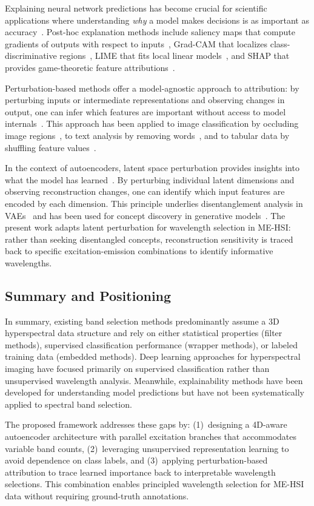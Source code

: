 Explaining neural network predictions has become crucial for scientific applications where understanding \emph{why} a model makes decisions is as important as accuracy~\cite{gilpin2018explaining}.
Post-hoc explanation methods include saliency maps that compute gradients of outputs with respect to inputs~\cite{simonyan2014deep}, Grad-CAM that localizes class-discriminative regions~\cite{selvaraju2017grad}, LIME that fits local linear models~\cite{ribeiro2016should}, and SHAP that provides game-theoretic feature attributions~\cite{lundberg2017unified}.

Perturbation-based methods offer a model-agnostic approach to attribution: by perturbing inputs or intermediate representations and observing changes in output, one can infer which features are important without access to model internals~\cite{zeiler2014visualizing}.
This approach has been applied to image classification by occluding image regions~\cite{zeiler2014visualizing}, to text analysis by removing words~\cite{li2016understanding}, and to tabular data by shuffling feature values~\cite{fisher2019all}.

In the context of autoencoders, latent space perturbation provides insights into what the model has learned~\cite{higgins2017beta}.
By perturbing individual latent dimensions and observing reconstruction changes, one can identify which input features are encoded by each dimension.
This principle underlies disentanglement analysis in VAEs~\cite{chen2018isolating} and has been used for concept discovery in generative models~\cite{voynov2020unsupervised}.
The present work adapts latent perturbation for wavelength selection in ME-HSI: rather than seeking disentangled concepts, reconstruction sensitivity is traced back to specific excitation-emission combinations to identify informative wavelengths.

\subsection{Summary and Positioning}
\label{sec:related_summary}

In summary, existing band selection methods predominantly assume a 3D hyperspectral data structure and rely on either statistical properties (filter methods), supervised classification performance (wrapper methods), or labeled training data (embedded methods).
Deep learning approaches for hyperspectral imaging have focused primarily on supervised classification rather than unsupervised wavelength analysis.
Meanwhile, explainability methods have been developed for understanding model predictions but have not been systematically applied to spectral band selection.

The proposed framework addresses these gaps by: (1)~designing a 4D-aware autoencoder architecture with parallel excitation branches that accommodates variable band counts, (2)~leveraging unsupervised representation learning to avoid dependence on class labels, and (3)~applying perturbation-based attribution to trace learned importance back to interpretable wavelength selections.
This combination enables principled wavelength selection for ME-HSI data without requiring ground-truth annotations.